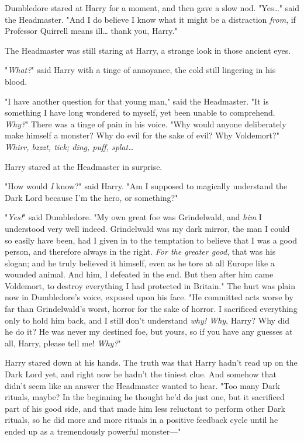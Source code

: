 Dumbledore stared at Harry for a moment, and then gave a slow nod. 
"Yes{\ldots}" said the Headmaster. "And I do believe I know what it might be a 
distraction \emph{from}, if Professor Quirrell means ill{\ldots} thank you, 
Harry."

The Headmaster was still staring at Harry, a strange look in those ancient eyes.

"\emph{What?}" said Harry with a tinge of annoyance, the cold still lingering 
in his blood.

"I have another question for that young man," said the Headmaster. "It is 
something I have long wondered to myself, yet been unable to comprehend. 
\emph{Why?}" There was a tinge of pain in his voice. "Why would anyone 
deliberately make himself a monster? Why do evil for the sake of evil? Why 
Voldemort?"
\sbreak
\emph{Whirr, bzzzt, tick; ding, puff, splat{\ldots}}

Harry stared at the Headmaster in surprise.

"How would \emph{I} know?" said Harry. "Am I supposed to magically understand 
the Dark Lord because I'm the hero, or something?"

"\emph{Yes!}" said Dumbledore. "My own great foe was Grindelwald, and 
\emph{him} I understood very well indeed. Grindelwald was my dark mirror, the 
man I could so easily have been, had I given in to the temptation to believe 
that I was a good person, and therefore always in the right. \emph{For the 
greater good}, that was his slogan; and he truly believed it himself, even as 
he tore at all Europe like a wounded animal. And him, I defeated in the end. 
But then after him came Voldemort, to destroy everything I had protected in 
Britain." The hurt was plain now in Dumbledore's voice, exposed upon his face. 
"He committed acts worse by far than Grindelwald's worst, horror for the sake 
of horror. I sacrificed everything only to hold him back, and I still don't 
understand \emph{why! Why}, Harry? Why did he do it? He was never my destined 
foe, but yours, so if you have any guesses at all, Harry, please tell me! 
\emph{Why?}"

Harry stared down at his hands. The truth was that Harry hadn't read up on the 
Dark Lord yet, and right now he hadn't the tiniest clue. And somehow that 
didn't seem like an answer the Headmaster wanted to hear. "Too many Dark 
rituals, maybe? In the beginning he thought he'd do just one, but it sacrificed 
part of his good side, and that made him less reluctant to perform other Dark 
rituals, so he did more and more rituals in a positive feedback cycle until he 
ended up as a tremendously powerful monster---"

